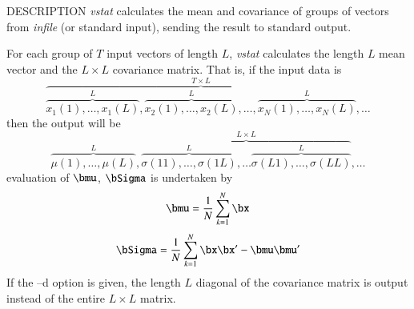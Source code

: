 \begin{synopsis}
\item[vstat] [ --l $L$ ] [ --n $N$ ] [ --t $T$ ] [ --c $C$ ] [ --d ] [ --o $O$ ] [ {\em infile} ]
\end{synopsis}

\begin{qsection}{DESCRIPTION}
{\em vstat} calculates the mean and covariance of groups of vectors 
from {\em infile} (or standard input), 
sending the result to standard output.

For each group of $T$ input vectors of length $L$, 
{\em vstat} calculates the length $L$ mean vector 
and the $L\times L$ covariance matrix. 
That is, if the input data is
\begin{displaymath}
\overbrace{
  \overbrace{x_1(1),\dots,x_1(L)}^{L},
  \overbrace{x_2(1),\dots,x_2(L)}^{L},\dots,
  \overbrace{x_N(1),\dots,x_N(L)}^{L}
}^{T \times L},\dots
\end{displaymath}
then the output will be 
\begin{displaymath}
  \overbrace{\mu(1),\dots,\mu(L)}^L, 
  \overbrace{
    \overbrace{\sigma(11),\dots,\sigma(1L)}^L, \dots
    \overbrace{\sigma(L1),\dots,\sigma(LL)}^L
  }^{L\times L}, \dots
\end{displaymath}
evaluation of $\bmu$, $\bSigma$ is undertaken by
\begin{displaymath}
  \bmu = \frac{1}{N}\sum_{k=1}^{N} \bx
\end{displaymath}
\begin{displaymath}
  \bSigma = \frac{1}{N}\sum_{k=1}^{N}
	\bx \bx'
	- \bmu \bmu'
\end{displaymath}
If the --d option is given, 
the length $L$ diagonal of the covariance matrix is output 
instead of the entire $L\times L$ matrix.


\end{qsection}
